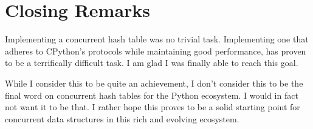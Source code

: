 \section{Closing Remarks}\label{sec:closing-remarks}

Implementing a concurrent hash table was no trivial task.
Implementing one that adheres to CPython's protocols while maintaining good performance, has proven to be a terrifically difficult task.
I am glad I was finally able to reach this goal.

While I consider this to be quite an achievement, I don't consider this to be the final word on concurrent hash tables for the Python ecosystem.
I would in fact not want it to be that.
I rather hope this proves to be a solid starting point for concurrent data structures in this rich and evolving ecosystem.
